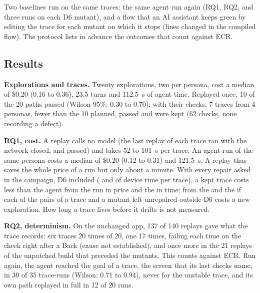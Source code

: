 Two baselines run on the same traces: the same agent run again (RQ1, RQ2, and three runs on each \textsf{D6} mutant), and a flow that an AI assistant keeps green by editing the trace for each mutant on which it stops (lines changed in the compiled flow). The protocol lists in advance the outcomes that count against ECR.

\subsection{Results}

\textbf{Explorations and traces.} Twenty explorations, two per persona, cost a median of \$0.20 (0.16 to 0.36), 23.5 turns and 112.5~s of agent time. Replayed once, 10 of the 20 paths passed (Wilson 95\%: 0.30 to 0.70); with their checks, 7 traces from 4 personas, fewer than the 10 planned, passed and were kept (62 checks, none recording a defect).

\textbf{RQ1, cost.} A replay calls no model (the last replay of each trace ran with the network closed, and passed) and takes 52 to 101~s per trace. An agent run of the same persona costs a median of \$0.20 (0.12 to 0.31) and 121.5~s. A replay thus saves the whole price of a run but only about a minute. With every repair asked in the campaign, \textsf{D6} included (\BEreprice{} and \BEresec{} of device time per trace), a kept trace costs less than the agent from the \BEprice{} run in price and the \BEtime{} in time; from the \BEpriceX{} and the \BEtimeX{} if each of the \BEunrepaired{} pairs of a trace and a mutant left unrepaired outside \textsf{D6} costs a new exploration. How long a trace lives before it drifts is not measured.

\textbf{RQ2, determinism.} On the unchanged app, 137 of 140 replays gave what the trace records: six traces 20 times of 20, one 17 times, failing each time on the check right after a Back (cause not established), and once more in the 21 replays of the unpatched build that preceded the mutants. This counts against ECR. Run again, the agent reached the goal of a trace, the screen that its last checks name, in 30 of 35 trace-runs (Wilson: 0.71 to 0.94), never for the unstable trace, and its own path replayed in full in 12 of 20 runs.

